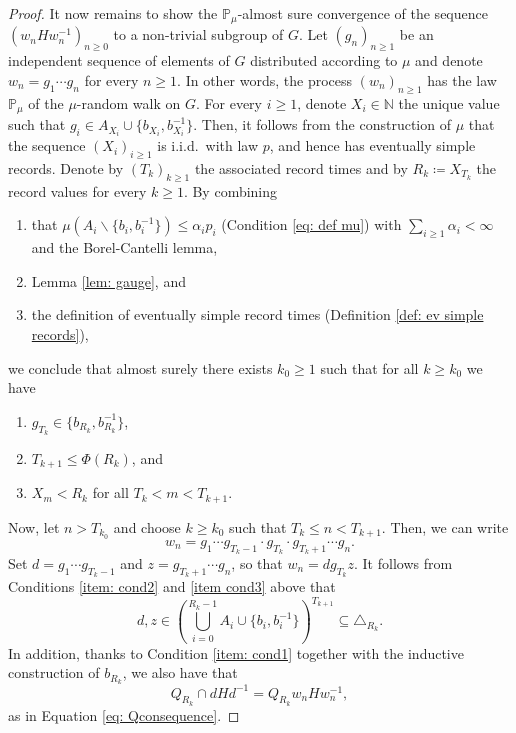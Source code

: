 \documentclass[reqno,a4paper,11pt]{amsart}
\numberwithin{equation}{section}
\newcommand{\1}{\mathbf{1}}
\def\N{{\mathbb N}}
\def\P{{\mathbb P}}
\theoremstyle{definition}
\begin{document}
\begin{proof}
		
		It now remains to show the $\P_\mu$-almost sure convergence of the sequence $(w_n H w_n^{-1})_{n\ge 0}$ to a non-trivial subgroup of $G$. 
		Let $(g_n)_{n\ge 1}$ be an independent sequence of elements of $G$ distributed according to $\mu$ and denote $w_n=g_1\cdots g_n$ for every $n\ge 1$. In other words, the process $(w_n)_{n\ge 1}$ has the law $\P_\mu$ of the $\mu$-random walk on $G$. For every $i\ge 1$, denote $X_i\in \N$ the unique value such that $g_i\in A_{X_i}\cup \{b_{X_i},b_{X_i}^{-1}\}$. Then, it follows from the construction of $\mu$ that the sequence $(X_i)_{i\ge 1}$ is i.i.d.\ with law $p$, and hence has eventually simple records. Denote by $(T_k)_{k\ge 1}$ the associated record times and by $R_k\coloneqq X_{T_k}$ the record values for every $k\ge 1$.
		By combining
		\begin{enumerate}[label=(\alph*)]
			\item that $\mu(A_i\backslash\{b_i,b_i^{-1}\})\le \alpha_i p_i$ (Condition \eqref{eq: def mu}) with $\sum_{i\ge 1}\alpha_i<\infty$ and the Borel-Cantelli lemma,
			\item Lemma \ref{lem: gauge}, and
			\item the definition of eventually simple record times (Definition \ref{def: ev simple records}),
		\end{enumerate}
		we conclude that almost surely there exists $k_0\ge 1$ such that for all $k\ge k_0$ we have
		\begin{enumerate}[label=(\Alph*)]
			\item\label{item: cond1} $g_{T_k}\in \{b_{R_k},b_{R_k}^{-1}\}$,
			\item\label{item: cond2} $T_{k+1}\le \Phi(R_k)$, and
			\item\label{item cond3} $X_m<R_k$ for all $T_k<m<T_{k+1}$.
		\end{enumerate}
		
		Now, let $n>T_{k_0}$ and choose $k\ge k_0$ such that $T_k\le n<T_{k+1}$. Then, we can write
		\begin{equation*}
			w_n=g_1\cdots g_{T_{k}-1}\cdot g_{T_k} \cdot g_{T_k+1}\cdots g_n.
		\end{equation*}
		Set $d=g_1\cdots g_{T_{k}-1}$ and $z=g_{T_k+1}\cdots g_n$, so that $w_n=dg_{T_k}z$. It follows from Conditions \ref{item: cond2} and \ref{item cond3} above that
		\begin{equation*}
			d,z\in \left( \bigcup_{i=0}^{R_k-1}A_i\cup \{b_i,b_i^{-1} \}\right)^{T_{k+1}}\subseteq \triangle_{R_k}.
		\end{equation*}
		In addition, thanks to Condition \ref{item: cond1} together with the inductive construction of $b_{R_k}$, we also have that
		\begin{equation*}
			Q_{R_k}\cap dHd^{-1}=Q_{R_k}w_nHw_{n}^{-1},
		\end{equation*}
		as in Equation \eqref{eq: Qconsequence}.
		

\end{proof}
\end{document}
